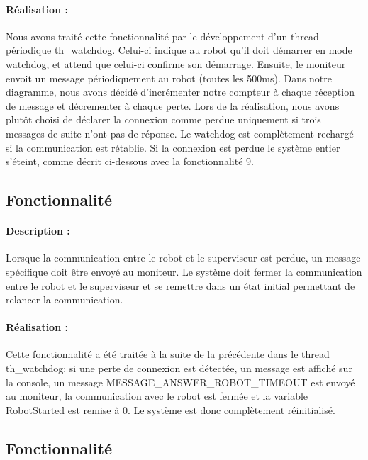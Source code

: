 \documentclass[11pt, a4paper]{paper}
\newcounter{cptreq}
\begin{document}
{{\paragraph{\color{black}Réalisation :}  {\color{black} Nous avons traité cette fonctionnalité par le développement d'un thread périodique th\_watchdog. Celui-ci indique au robot qu'il doit démarrer en mode watchdog, et attend que celui-ci confirme son démarrage. Ensuite, le moniteur envoit un message périodiquement au robot (toutes les 500ms). Dans notre diagramme, nous avons décidé d'incrémenter notre compteur à chaque réception de message et décrementer à chaque perte. Lors de la réalisation, nous avons plutôt choisi de déclarer la connexion comme perdue uniquement si trois messages de suite n'ont pas de réponse. Le watchdog est complètement rechargé si la communication est rétablie. Si la connexion est perdue le système entier s'éteint, comme décrit ci-dessous avec la fonctionnalité 9. }

\subsection{Fonctionnalité \thecptreq }

\paragraph{Description :} Lorsque la communication entre le robot et le superviseur est perdue, un message spécifique doit être envoyé au moniteur. Le système doit fermer la communication entre le robot et le superviseur et se remettre dans un état initial permettant de relancer la communication.

\paragraph{\color{black}Réalisation :}  {\color{black} Cette fonctionnalité a été traitée à la suite de la précédente dans le thread th\_watchdog: si une perte de connexion est détectée, un message est affiché sur la console, un message MESSAGE\_ANSWER\_ROBOT\_TIMEOUT est envoyé au moniteur, la communication avec le robot est fermée et la variable RobotStarted est remise à 0. Le système est donc complètement réinitialisé.}

{\color{black}
\subsection{Fonctionnalité \thecptreq *}

}}}
\end{document}
